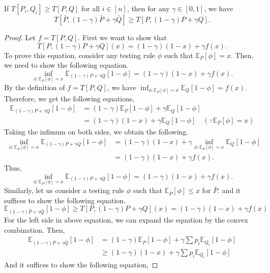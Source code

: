 \documentclass{article}
\begin{document}
\begin{lemma}\label{samplinglemma2}
    If $T[P_i,Q_i] \ge T[P,Q]$ for all $i \in [n]$, then for any $\gamma \in [0,1]$, we have
    \begin{equation*}
        T[\bar{P}, (1-\gamma)\bar{P}+\gamma\bar{Q}] \ge T[P,(1-\gamma)P+\gamma Q].
    \end{equation*}
    \begin{proof}
        Let $f= T[P,Q]$. First we want to show that
        \begin{equation*}
            T[P,(1-\gamma) P+\gamma Q](x) = (1-\gamma)(1-x) + \gamma f(x).
        \end{equation*}
        To prove this equation, consider any testing rule $\phi$ such that $\mathbb{E}_P[\phi] = x$. Then, we need to show the following equation.
        \begin{equation*}
            \inf_{\phi:\mathbb{E}_P[\phi] = x}\mathbb{E}_{(1-\gamma)P +\gamma Q}[1-\phi] = (1-\gamma)(1-x) +\gamma f(x).
        \end{equation*}
        By the definition of $f = T[P,Q]$, we have $\inf_{\phi : \mathbb{E}_P[\phi] = x}\mathbb{E}_Q[1-\phi] = f(x)$. Therefore, we get the following equations,
        \begin{align*}
            \mathbb{E}_{(1-\gamma)P +\gamma Q}[1-\phi] &= (1-\gamma)\mathbb{E}_P[1-\phi] + \gamma \mathbb{E}_Q[1-\phi]\\
            &=(1-\gamma)(1-x) + \gamma \mathbb{E}_Q[1-\phi] \quad(\because \mathbb{E}_P[\phi]= x)
        \end{align*}
        Taking the infimum on both sides, we obtain the following.
        \begin{align*}
            \inf_{\phi:\mathbb{E}_P[\phi] = x}\mathbb{E}_{(1-\gamma)P +\gamma Q}[1-\phi] &= (1-\gamma)(1-x) + \gamma   \inf_{\phi:\mathbb{E}_P[\phi] = x} \mathbb{E}_Q[1-\phi]\\
            &=(1- \gamma)(1-x) + \gamma f(x).
        \end{align*}
    Thus,
    \begin{equation*}
         \inf_{\phi:\mathbb{E}_P[\phi] = x}\mathbb{E}_{(1-\gamma)P +\gamma Q}[1-\phi] = (1-\gamma)(1-x) +\gamma f(x).
    \end{equation*}
    Similarly, let us consider a testing rule $\phi$ such that $\mathbb{E}_{\bar{P}}[\phi] \le x$ for $\bar{P}$. and it suffices to show the following equation.
    \begin{equation*}
        \mathbb{E}_{(1-\gamma)\bar{P} + \gamma \bar{Q}}[1-\phi] \ge T[P,(1-\gamma)P +\gamma Q](x) = (1-\gamma)(1-x) +\gamma f(x)
    \end{equation*}
    For the left side in above equation, we can expand the equation by the convex combination. Then,
    \begin{align*}
         \mathbb{E}_{(1-\gamma)\bar{P} + \gamma \bar{Q}}[1-\phi] &= (1-\gamma)\mathbb{E}_{\bar{P}}[1-\phi] + \gamma \sum p_i \mathbb{E}_{Q_i}[1-\phi]\\
         & \ge (1-\gamma)(1-x) + \gamma \sum p_i \mathbb{E}_{Q_i}[1-\phi]
    \end{align*}
    And it suffices to show the following equation,
    

\end{proof}
\end{lemma}
\end{document}
